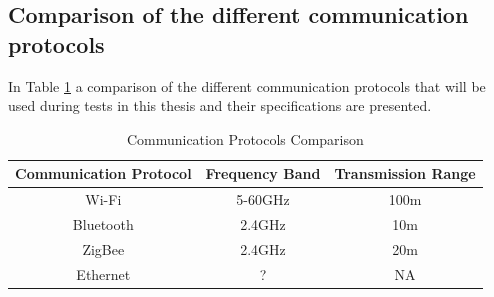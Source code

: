 \subsection*{Comparison of the different communication protocols}
In Table \ref{CommunicationProtocolsComparison} a comparison of the different communication protocols that will be used during tests in this thesis and their specifications are presented. \\
\begin{table}[!hbtp]
\begin{tabular}{||c | c | c ||} 
 \hline
 Communication Protocol & Frequency Band & Transmission Range  \\ [0.5ex]
 \hline\hline
 Wi-Fi & 5-60GHz & 100m \\ 
 Bluetooth & 2.4GHz & 10m \\
 ZigBee & 2.4GHz & 20m \\
 Ethernet & ? & NA \\ [1ex] 
 \hline
\end{tabular}
\caption{Communication Protocols Comparison}
\label{CommunicationProtocolsComparison}
\end{table}